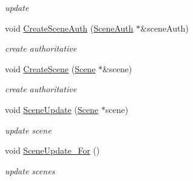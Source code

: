 \begin{DoxyCompactItemize}
\begin{DoxyCompactList}\small\item\em update \item\end{DoxyCompactList}\item 
\hypertarget{classContent_1_1Universe_a578f973940e488a75756ef0152a4c44d}{
void \hyperlink{classContent_1_1Universe_a578f973940e488a75756ef0152a4c44d}{CreateSceneAuth} (\hyperlink{classContent_1_1SceneAuth}{SceneAuth} $\ast$\&sceneAuth)}
\label{classContent_1_1Universe_a578f973940e488a75756ef0152a4c44d}

\begin{DoxyCompactList}\small\item\em create authoritative \item\end{DoxyCompactList}\item 
\hypertarget{classContent_1_1Universe_aa4f05e9d13cbf6a7f464a2ea40e5571d}{
void \hyperlink{classContent_1_1Universe_aa4f05e9d13cbf6a7f464a2ea40e5571d}{CreateScene} (\hyperlink{classContent_1_1Scene}{Scene} $\ast$\&scene)}
\label{classContent_1_1Universe_aa4f05e9d13cbf6a7f464a2ea40e5571d}

\begin{DoxyCompactList}\small\item\em create authoritative \item\end{DoxyCompactList}\item 
\hypertarget{classContent_1_1Universe_acaaf591188bbb922834c04f0fef31643}{
void \hyperlink{classContent_1_1Universe_acaaf591188bbb922834c04f0fef31643}{SceneUpdate} (\hyperlink{classContent_1_1Scene}{Scene} $\ast$scene)}
\label{classContent_1_1Universe_acaaf591188bbb922834c04f0fef31643}

\begin{DoxyCompactList}\small\item\em update scene \item\end{DoxyCompactList}\item 
\hypertarget{classContent_1_1Universe_aa099410777536956947c04fd453d00a5}{
void \hyperlink{classContent_1_1Universe_aa099410777536956947c04fd453d00a5}{SceneUpdate\_\-For} ()}
\label{classContent_1_1Universe_aa099410777536956947c04fd453d00a5}

\begin{DoxyCompactList}\small\item\em update scenes \item\end{DoxyCompactList}\end{DoxyCompactItemize}
